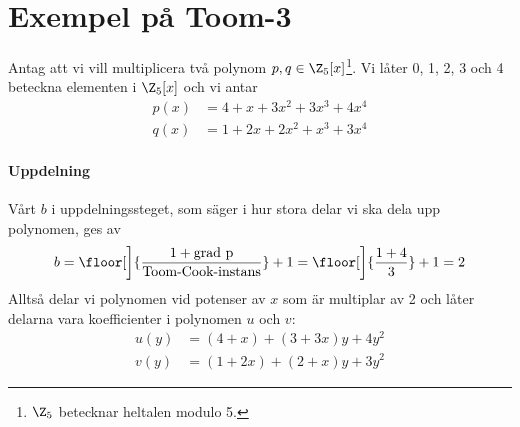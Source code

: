 \section{Exempel på Toom-3}

Antag att vi vill multiplicera två polynom $p, q \in
\Z_5[x]$\footnote{$\Z_5$ betecknar heltalen modulo 5.}. Vi
låter 0, 1, 2, 3 och 4 beteckna elementen i $\Z_5[x]$ och vi antar
\begin{align*}
  p(x) &= 4+x+3x^2+3x^3+4x^4 \\
  q(x) &= 1+2x+2x^2+x^3+3x^4
\end{align*}

\paragraph{Uppdelning}
Vårt $b$ i uppdelningssteget, som säger i hur stora delar vi ska dela upp
polynomen, ges av
\begin{equation*}
  b = \floor[\bigg]{\frac{1 + \mbox{grad p}}{\mbox{Toom-Cook-instans}}} + 1 = \floor[\bigg]{\frac{1 + 4}{3}} + 1 = 2
\end{equation*}
Alltså delar vi polynomen vid potenser av $x$ som är multiplar av 2 och låter
delarna vara koefficienter i polynomen $u$ och $v$:
\begin{align*}
  u(y) &= (4+x)+(3 + 3x)y+ 4y^2 \\
  v(y) &= (1 + 2x)+ (2 + x)y + 3y^2
\end{align*}

